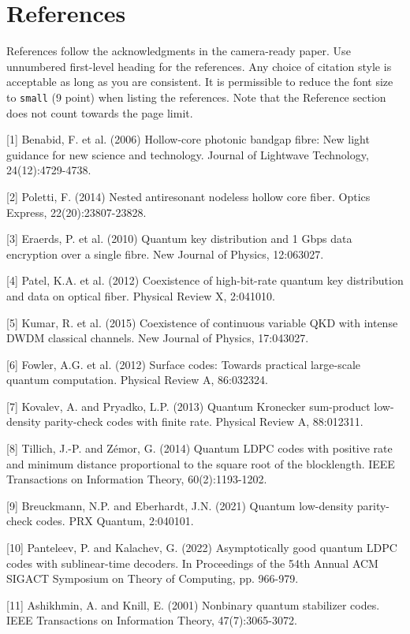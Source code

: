 \documentclass{article}
\begin{document}
\section*{References}

References follow the acknowledgments in the camera-ready paper. Use unnumbered first-level heading for the references. Any choice of citation style is acceptable as long as you are consistent. It is permissible to reduce the font size to \verb+small+ (9 point) when listing the references. Note that the Reference section does not count towards the page limit.

{
\small

[1] Benabid, F. et al. (2006) Hollow-core photonic bandgap fibre: New light guidance for new science and technology. Journal of Lightwave Technology, 24(12):4729-4738.

[2] Poletti, F. (2014) Nested antiresonant nodeless hollow core fiber. Optics Express, 22(20):23807-23828.

[3] Eraerds, P. et al. (2010) Quantum key distribution and 1 Gbps data encryption over a single fibre. New Journal of Physics, 12:063027.

[4] Patel, K.A. et al. (2012) Coexistence of high-bit-rate quantum key distribution and data on optical fiber. Physical Review X, 2:041010.

[5] Kumar, R. et al. (2015) Coexistence of continuous variable QKD with intense DWDM classical channels. New Journal of Physics, 17:043027.

[6] Fowler, A.G. et al. (2012) Surface codes: Towards practical large-scale quantum computation. Physical Review A, 86:032324.

[7] Kovalev, A. and Pryadko, L.P. (2013) Quantum Kronecker sum-product low-density parity-check codes with finite rate. Physical Review A, 88:012311.

[8] Tillich, J.-P. and Zémor, G. (2014) Quantum LDPC codes with positive rate and minimum distance proportional to the square root of the blocklength. IEEE Transactions on Information Theory, 60(2):1193-1202.

[9] Breuckmann, N.P. and Eberhardt, J.N. (2021) Quantum low-density parity-check codes. PRX Quantum, 2:040101.

[10] Panteleev, P. and Kalachev, G. (2022) Asymptotically good quantum LDPC codes with sublinear-time decoders. In Proceedings of the 54th Annual ACM SIGACT Symposium on Theory of Computing, pp. 966-979.

[11] Ashikhmin, A. and Knill, E. (2001) Nonbinary quantum stabilizer codes. IEEE Transactions on Information Theory, 47(7):3065-3072.

}
\end{document}
